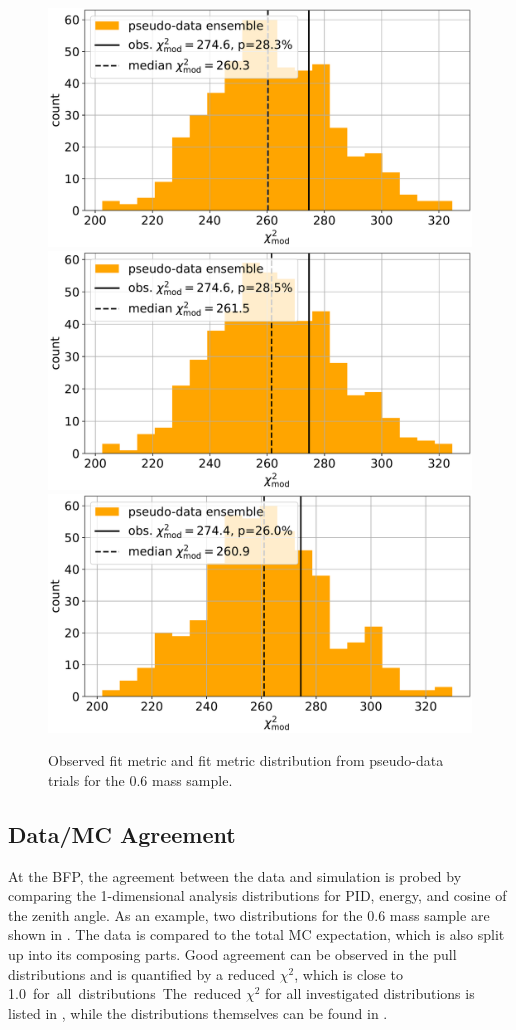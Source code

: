 \begin{figure}[h]
    \includegraphics[width=0.32\linewidth]{figures/results/blind_fits/full_blind_fit_0.3_GeV_gauss_plus_poisson_step_3_4-1.png}
    \includegraphics[width=0.32\linewidth]{figures/results/blind_fits/full_blind_fit_0.6_GeV_gauss_plus_poisson_step_3_4-1.png}
    \includegraphics[width=0.32\linewidth]{figures/results/blind_fits/full_blind_fit_1.0_GeV_gauss_plus_poisson_step_3_4-1.png}
	\caption[Pseudo-data trials fit metric distribution (\SI{0.6}{\gev})]{Observed fit metric and fit metric distribution from pseudo-data trials for the \SI{0.6}{\gev} mass sample.}
\end{figure}


\subsection{Data/MC Agreement}

At the BFP, the agreement between the data and simulation is probed by comparing the 1-dimensional analysis distributions for PID, energy, and cosine of the zenith angle. As an example, two distributions for the \SI{0.6}{\gev} mass sample are shown in . The data is compared to the total MC expectation, which is also split up into its composing parts. Good agreement can be observed in the pull distributions and is quantified by a reduced $\chi^2$, which is close to \SI{1.0} for all distributions. The reduced $\chi^2$ for all investigated distributions is listed in , while the distributions themselves can be found in .

